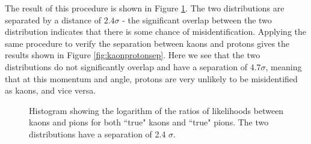 The result of this procedure is shown in Figure \ref{fig:kaonpionsep}. The two distributions are separated by a distance of $2.4 \sigma$ - the significant overlap between the two distribution indicates that there is some chance of misidentification. Applying the same procedure to verify the separation between kaons and protons gives the results shown in Figure \ref{fig:kaonprotonsep}. Here we see that the two distributions do not significantly overlap and have a separation of $4.7 \sigma$, meaning that at this momentum and angle, protons are very unlikely to be misidentified as kaons, and vice versa.
\begin{figure}[]
\centering
{}
\caption[Particle identification separation for 7 GeV pions and kaons]{Histogram showing the logarithm of the ratios of likelihoods between kaons and pions for both ``true" kaons and ``true" pions. The two distributions have a separation of 2.4 $\sigma$.}
\label{fig:kaonpionsep} 
\end{figure}

